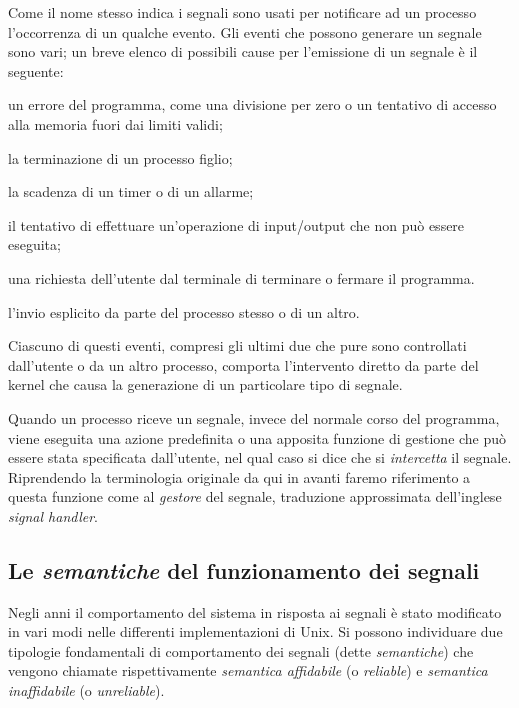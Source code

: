 Come il nome stesso indica i segnali sono usati per notificare ad un processo
l'occorrenza di un qualche evento. Gli eventi che possono generare un segnale
sono vari; un breve elenco di possibili cause per l'emissione di un segnale è
il seguente:

\begin{itemize*}
\item un errore del programma, come una divisione per zero o un tentativo di
  accesso alla memoria fuori dai limiti validi;
\item la terminazione di un processo figlio;
\item la scadenza di un timer o di un allarme;
\item il tentativo di effettuare un'operazione di input/output che non può
  essere eseguita;
\item una richiesta dell'utente dal terminale di terminare o fermare il
  programma.
\item l'invio esplicito da parte del processo stesso o di un altro.
\end{itemize*}

Ciascuno di questi eventi, compresi gli ultimi due che pure sono controllati
dall'utente o da un altro processo, comporta l'intervento diretto da parte del
kernel che causa la generazione di un particolare tipo di segnale.

Quando un processo riceve un segnale, invece del normale corso del programma,
viene eseguita una azione predefinita o una apposita funzione di gestione che
può essere stata specificata dall'utente, nel qual caso si dice che si
\textsl{intercetta} il segnale. Riprendendo la terminologia originale da qui
in avanti faremo riferimento a questa funzione come al \textsl{gestore} del
segnale, traduzione approssimata dell'inglese \textit{signal handler}.


\subsection{Le \textsl{semantiche} del funzionamento dei segnali}
\label{sec:sig_semantics}

Negli anni il comportamento del sistema in risposta ai segnali è stato
modificato in vari modi nelle differenti implementazioni di Unix.  Si possono
individuare due tipologie fondamentali di comportamento dei segnali (dette
\textsl{semantiche}) che vengono chiamate rispettivamente \textsl{semantica
  affidabile} (o \textit{reliable}) e \textsl{semantica inaffidabile} (o
\textit{unreliable}).

